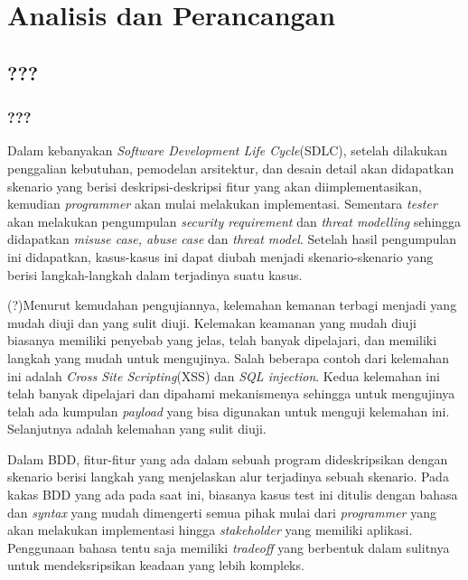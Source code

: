 \chapter{Analisis dan Perancangan}

\section{???}

\subsection{???}

Dalam kebanyakan \textit{Software Development Life Cycle}(SDLC), setelah dilakukan
penggalian kebutuhan, pemodelan arsitektur, dan desain detail akan didapatkan
skenario yang berisi deskripsi-deskripsi fitur yang akan diimplementasikan,
kemudian \emph{programmer} akan mulai melakukan implementasi.
Sementara \emph{tester} akan melakukan
pengumpulan \emph{security requirement} dan \emph{threat modelling} sehingga didapatkan
\emph{misuse case, abuse case} dan \emph{threat model}. Setelah hasil pengumpulan ini
didapatkan, kasus-kasus ini dapat diubah menjadi skenario-skenario yang berisi
langkah-langkah dalam terjadinya suatu kasus.

(?)Menurut kemudahan pengujiannya, kelemahan kemanan terbagi menjadi yang mudah diuji
dan yang sulit diuji. Kelemakan keamanan yang mudah diuji biasanya memiliki penyebab
yang jelas, telah banyak dipelajari, dan memiliki langkah yang mudah untuk mengujinya.
Salah beberapa contoh dari kelemahan ini adalah \emph{Cross Site Scripting}(XSS) dan
\emph{SQL injection}. Kedua kelemahan ini telah banyak dipelajari dan dipahami mekanismenya
sehingga untuk mengujinya telah ada kumpulan \emph{payload} yang bisa digunakan untuk menguji
kelemahan ini. Selanjutnya adalah kelemahan yang sulit diuji.

Dalam BDD, fitur-fitur yang ada dalam sebuah program dideskripsikan dengan skenario
berisi langkah yang menjelaskan alur terjadinya sebuah skenario. Pada kakas BDD
yang ada pada saat ini, biasanya kasus test ini ditulis dengan bahasa dan \emph{syntax}
yang mudah dimengerti semua pihak mulai dari \emph{programmer} yang akan melakukan implementasi
hingga \emph{stakeholder} yang memiliki aplikasi. Penggunaan bahasa tentu saja memiliki \emph{tradeoff}
yang berbentuk dalam sulitnya untuk mendeksripsikan keadaan yang lebih kompleks.


